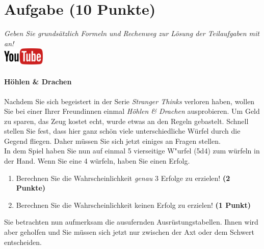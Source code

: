 \documentclass[a4paper, 10pt]{scrartcl}\usepackage[]{graphicx}\usepackage[]{xcolor}
\begin{document}
\clearpage\null 
\clearpage

\section{Aufgabe \hfill (10 Punkte)}

\textit{Geben Sie grunds{\"a}tzlich Formeln und Rechenweg zur L{\"o}sung der
  Teilaufgaben mit an!} \\[1Ex]

\hfill\href{https://youtu.be/8Pb2sKUIMyk}{\includegraphics[width =
  2cm]{img/youtube}} %
\hspace{2Ex}

\paragraph{H{\"o}hlen \& Drachen}



Nachdem Sie sich begeistert in der Serie \textit{Stranger Thinks} verloren
haben, wollen Sie bei einer Ihrer Freundinnen einmal \textit{H{\"o}hlen \& Drachen}
ausprobieren. Um Geld zu sparen, das Zeug kostet echt, wurde etwas an den
Regeln gebastelt. Schnell stellen Sie fest, dass hier ganz sch{\"o}n viele
unterschiedliche W{\"u}rfel durch die Gegend fliegen. Daher m{\"u}ssen Sie sich
jetzt einiges an Fragen stellen. \\%

In dem Spiel haben Sie nun auf einmal 5 vierseitige W{"u}rfel (5d4) zum w{\"u}rfeln in der Hand. Wenn Sie eine 4 w{\"u}rfeln,
haben Sie einen Erfolg.

\begin{enumerate}
\item Berechnen Sie die Wahrscheinlichkeit \textit{genau}
  3 Erfolge zu erzielen!  \textbf{(2 Punkte)}
\item Berechnen Sie die Wahrscheinlichkeit keinen Erfolg zu erzielen!
  \textbf{(1 Punkt)}
\end{enumerate}

Sie betrachten nun aufmerksam die ausufernden Ausr{\"u}stungstabellen. Ihnen
wird aber geholfen und Sie m{\"u}ssen sich jetzt nur zwischen der Axt oder dem
Schwert entscheiden.
\end{document}
